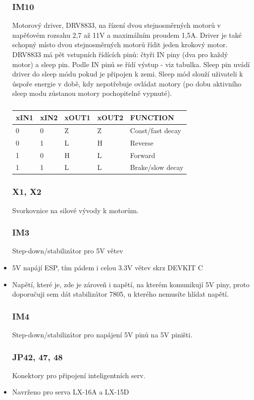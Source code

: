 \documentclass{template/socthesis}
\begin{document}
\begin{itemize}
	\subsubsection*{IM10}
	Motorový driver, DRV8833, na řízení dvou stejnosměrných motorů v napěťovém rozsahu 2,7 až 11V a maximálním proudem 1,5A. 
	Driver je také schopný místo dvou stejnosměrných motorů řídit jeden krokový motor.
	DRV8833 má pět vstupních řídících pinů: čtyři IN piny (dva pro každý motor) a sleep pin.  Podle IN pinů se řídí výstup - viz tabulka.
	Sleep pin uvádí driver do sleep módu pokud je připojen k zemi. Sleep mód slouží uživateli k úspoře energie v době, kdy nepotřebuje ovládat motory (po dobu aktivního sleep modu zůstanou motory pochopitelně vypnuté).
	
	\begin{table}[h]
		\centering
		\begin{tabular}{|l|l|l|l|l|}
			\hline
			xIN1 & xIN2 & xOUT1 & xOUT2 & FUNCTION \\ \hline
			0 & 0 & Z & Z & Coast/fast decay \\ 
			0 & 1 & L & H & Reverse \\ 
			1 & 0 & H & L & Forward \\ 
			1 & 1 & L & L & Brake/slow decay \\ 
			\hline
		\end{tabular}
		\caption{}
	\end{table}
	\newpage
	\subsubsection*{X1, X2}
	Svorkovnice na silové vývody k motorům.
	
	\subsubsection*{IM3}
	Step-down/stabilizátor pro 5V větev
	\item 5V napájí ESP, tím pádem i celou 3.3V větev skrz DEVKIT C
	\item Napětí, které je, zde je zároveň i napětí, na kterém komunikují 5V piny, proto doporučuji sem dát stabilizátor 7805, u kterého nemusíte hlídat napětí.
	
	\subsubsection*{IM4}
	Step-down/stabilizátor pro napájení 5V pinů na 5V piništi.
	
	\subsubsection*{JP42, 47, 48}
	Konektory pro připojení inteligentních serv.
	\item Navrženo pro serva LX-16A a LX-15D
	

\end{itemize}
\end{document}
